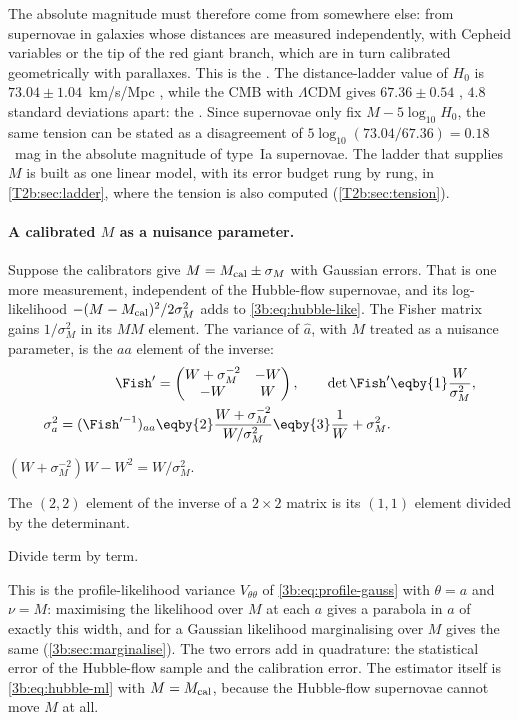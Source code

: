 The absolute magnitude must therefore come from somewhere else: from
supernovae in galaxies whose distances are measured independently, with
Cepheid variables or the tip of the red giant branch, which are in turn
calibrated geometrically with parallaxes. This is the . The distance-ladder value of $H_0$ is $73.04\pm1.04$~km/s/Mpc
\cite{Riess2022SH0ES}, while the CMB with $\Lambda$CDM gives $67.36\pm0.54$
\cite{Planck2018VI}, $4.8$ standard deviations apart: the . Since supernovae only fix
$M-5\log_{10}H_0$, the same tension can be stated as a disagreement of
$5\log_{10}(73.04/67.36)=0.18$~mag in the absolute magnitude of type~Ia supernovae.
The ladder that supplies $M$ is built as one linear model, with its error budget rung by rung, in
\cref{T2b:sec:ladder}, where the tension is also computed (\cref{T2b:sec:tension}).

\paragraph{A calibrated $M$ as a nuisance parameter.}
Suppose the calibrators give $M=M_{\rm cal}\pm\sigma_M$ with Gaussian errors.
That is one more measurement, independent of the Hubble-flow supernovae, and
its log-likelihood $-(M-M_{\rm cal})^2/2\sigma_M^2$ adds to
\eqref{3b:eq:hubble-like}. The Fisher matrix gains $1/\sigma_M^2$ in its
$MM$ element. The variance of $\hat a$, with $M$ treated as a nuisance
parameter, is the $aa$ element of the inverse:
\begin{align}
  \Fish'
  &=\begin{pmatrix}W+\sigma_M^{-2}&-W\\-W&W\end{pmatrix},
  \qquad
  \det\Fish'\eqby{1}\frac{W}{\sigma_M^2},
  \nonumber\\
  \sigma_a^2=(\Fish'^{-1})_{aa}
  &\eqby{2}\frac{W+\sigma_M^{-2}}{W/\sigma_M^2}
   \eqby{3}\frac1W+\sigma_M^2 .
  \label{3b:eq:hubble-calib}
\end{align}
\begin{explain}
  \item $(W+\sigma_M^{-2})W-W^2=W/\sigma_M^2$.
  \item The $(2,2)$ element of the inverse of a $2\times2$ matrix is its $(1,1)$
        element divided by the determinant.
  \item Divide term by term.
\end{explain}
This is the profile-likelihood variance $V_{\theta\theta}$ of
\eqref{3b:eq:profile-gauss} with $\theta=a$ and $\nu=M$: maximising the
likelihood over $M$ at each $a$ gives a parabola in $a$ of exactly this
width, and for a Gaussian likelihood marginalising over $M$ gives the same
(\cref{3b:sec:marginalise}). The two errors add in quadrature: the
statistical error of the Hubble-flow sample and the calibration error. The
estimator itself is \eqref{3b:eq:hubble-ml} with $M=M_{\rm cal}$, because
the Hubble-flow supernovae cannot move $M$ at all.

